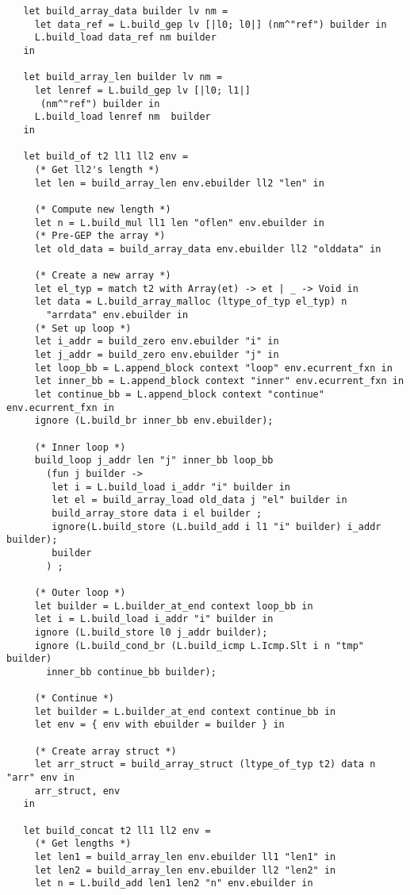 \documentclass[main.tex]{subfiles}
\begin{document}
\begin{lstlisting}
   let build_array_data builder lv nm =
     let data_ref = L.build_gep lv [|l0; l0|] (nm^"ref") builder in
     L.build_load data_ref nm builder
   in

   let build_array_len builder lv nm =
     let lenref = L.build_gep lv [|l0; l1|]
      (nm^"ref") builder in
     L.build_load lenref nm  builder
   in

   let build_of t2 ll1 ll2 env = 
     (* Get ll2's length *)
     let len = build_array_len env.ebuilder ll2 "len" in
    
     (* Compute new length *)
     let n = L.build_mul ll1 len "oflen" env.ebuilder in
     (* Pre-GEP the array *)
     let old_data = build_array_data env.ebuilder ll2 "olddata" in
     
     (* Create a new array *)
     let el_typ = match t2 with Array(et) -> et | _ -> Void in
     let data = L.build_array_malloc (ltype_of_typ el_typ) n
       "arrdata" env.ebuilder in
     (* Set up loop *)
     let i_addr = build_zero env.ebuilder "i" in
     let j_addr = build_zero env.ebuilder "j" in
     let loop_bb = L.append_block context "loop" env.ecurrent_fxn in
     let inner_bb = L.append_block context "inner" env.ecurrent_fxn in
     let continue_bb = L.append_block context "continue" env.ecurrent_fxn in
     ignore (L.build_br inner_bb env.ebuilder);

     (* Inner loop *)
     build_loop j_addr len "j" inner_bb loop_bb
       (fun j builder -> 
        let i = L.build_load i_addr "i" builder in
        let el = build_array_load old_data j "el" builder in
        build_array_store data i el builder ;
        ignore(L.build_store (L.build_add i l1 "i" builder) i_addr builder);
        builder 
       ) ;

     (* Outer loop *)
     let builder = L.builder_at_end context loop_bb in
     let i = L.build_load i_addr "i" builder in
     ignore (L.build_store l0 j_addr builder);
     ignore (L.build_cond_br (L.build_icmp L.Icmp.Slt i n "tmp" builder)
       inner_bb continue_bb builder);

     (* Continue *)
     let builder = L.builder_at_end context continue_bb in
     let env = { env with ebuilder = builder } in

     (* Create array struct *)
     let arr_struct = build_array_struct (ltype_of_typ t2) data n "arr" env in
     arr_struct, env
   in

   let build_concat t2 ll1 ll2 env =
     (* Get lengths *)
     let len1 = build_array_len env.ebuilder ll1 "len1" in
     let len2 = build_array_len env.ebuilder ll2 "len2" in
     let n = L.build_add len1 len2 "n" env.ebuilder in


\end{lstlisting}
\end{document}
